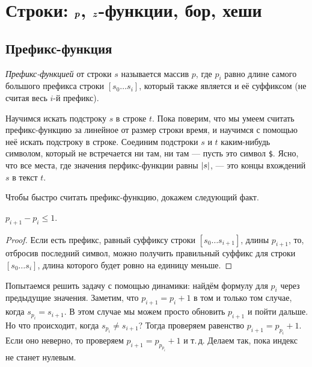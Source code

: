 \section{Строки: $\boldsymbol{p}$, $\boldsymbol{z}$-функции, бор, хеши}

\subsection{Префикс-функция}

\begin{definition}
    \textit{Префикс-функцией} от строки $s$ называется массив $p$, где $p_i$ равно длине самого большого префикса строки $[s_0\ldots s_i]$, который также является и её суффиксом (не считая весь $i$-й префикс).
\end{definition}

\begin{algorithm}
    Научимся искать подстроку $s$ в строке $t$. Пока поверим, что мы умеем считать префикс-функцию за линейное от размер строки время, и научимся с помощью неё искать подстроку в строке. Соединим подстроки $s$ и $t$ каким-нибудь символом, который не встречается ни там, ни там --- пусть это символ \texttt{\$}. Ясно, что все места, где значения перфикс-функции равны $\left\lvert s\right\rvert$, --- это концы вхождений $s$ в текст $t$.
\end{algorithm}

Чтобы быстро считать префикс-функцию, докажем следующий факт.

\begin{lemma}
    $p_{i + 1} - p_i \leqslant 1$.
\end{lemma}

\begin{proof}
    Если есть префикс, равный суффиксу строки $[s_0\ldots s_{i + 1}]$, длины $p_{i + 1}$, то, отбросив последний символ, можно получить правильный суффикс для строки $[s_0\ldots s_i]$, длина которого будет ровно на единицу меньше.
\end{proof}

Попытаемся решить задачу с помощью динамики: найдём формулу для $p_i$ через предыдущие значения. Заметим, что $p_{i + 1} = p_i + 1$ в том и только том случае, когда $s_{p_i} = s_{i + 1}$. В этом случае мы можем просто обновить $p_{i + 1}$ и пойти дальше. Но что происходит, когда $s_{p_i} \ne s_{i + 1}$? Тогда проверяем равенство $p_{i + 1} = p_{p_i} + 1$. Если оно неверно, то проверяем $p_{i + 1} = p_{p_{p_i}} + 1$ и т.\,д. Делаем так, пока индекс не станет нулевым.

